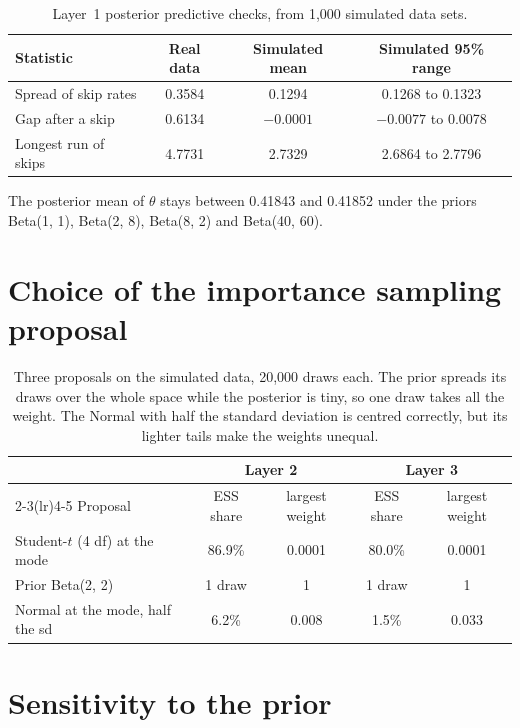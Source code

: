 \documentclass[12pt]{article}
\begin{document}
\begin{table}[H]
\centering
\small
\caption{Layer~1 posterior predictive checks, from 1{,}000 simulated data sets.}
\begin{tabular}{@{}lccc@{}}
\toprule
Statistic & Real data & Simulated mean & Simulated 95\% range \\
\midrule
Spread of skip rates & 0.3584 & 0.1294 & 0.1268 to 0.1323 \\
Gap after a skip & 0.6134 & $-0.0001$ & $-0.0077$ to 0.0078 \\
Longest run of skips & 4.7731 & 2.7329 & 2.6864 to 2.7796 \\
\bottomrule
\end{tabular}
\end{table}

The posterior mean of $\theta$ stays between 0.41843 and 0.41852 under the priors Beta(1, 1), Beta(2, 8), Beta(8, 2) and Beta(40, 60).

\section{Choice of the importance sampling proposal}\label{app:proposals}

\begin{table}[H]
\centering
\small
\caption{Three proposals on the simulated data, 20{,}000 draws each. The prior spreads its draws over the whole space while the posterior is tiny, so one draw takes all the weight. The Normal with half the standard deviation is centred correctly, but its lighter tails make the weights unequal.}
\label{tab:proposals}
\begin{tabular}{@{}lcccc@{}}
\toprule
 & \multicolumn{2}{c}{Layer 2} & \multicolumn{2}{c}{Layer 3} \\
\cmidrule(lr){2-3}\cmidrule(lr){4-5}
Proposal & ESS share & largest weight & ESS share & largest weight \\
\midrule
Student-$t$ (4 df) at the mode & 86.9\% & 0.0001 & 80.0\% & 0.0001 \\
Prior Beta(2, 2) & 1 draw & 1 & 1 draw & 1 \\
Normal at the mode, half the sd & 6.2\% & 0.008 & 1.5\% & 0.033 \\
\bottomrule
\end{tabular}
\end{table}

\section{Sensitivity to the prior}\label{app:sensitivity}
\end{document}
